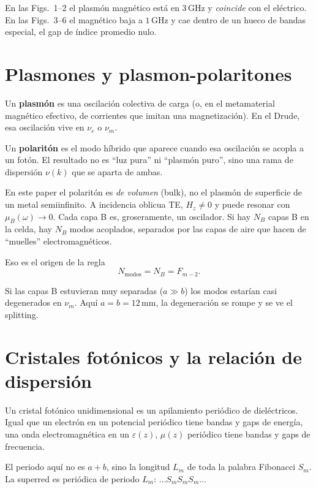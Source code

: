\documentclass[11pt,a4paper]{article}
\begin{document}
En las Figs.\ 1--2 el plasmón magnético está en \(3\,\mathrm{GHz}\) y
\emph{coincide} con el eléctrico.
En las Figs.\ 3--6 el magnético baja a \(1\,\mathrm{GHz}\) y cae dentro de un
hueco de bandas especial, el gap de índice promedio nulo.

\section{Plasmones y plasmon-polaritones}

Un \textbf{plasmón} es una oscilación colectiva de carga (o, en el metamaterial
magnético efectivo, de corrientes que imitan una magnetización).
En el Drude, esa oscilación vive en \(\nu_e\) o \(\nu_m\).

Un \textbf{polaritón} es el modo híbrido que aparece cuando esa oscilación se
acopla a un fotón. El resultado no es ``luz pura'' ni ``plasmón puro'', sino
una rama de dispersión \(\nu(k)\) que se aparta de ambas.

En este paper el polaritón es \emph{de volumen} (bulk), no el plasmón de
superficie de un metal semiinfinito.
A incidencia oblicua TE, \(H_z\neq 0\) y puede resonar con \(\mu_B(\omega)\to 0\).
Cada capa B es, groseramente, un oscilador.
Si hay \(N_B\) capas B en la celda, hay \(N_B\) modos acoplados, separados por
las capas de aire que hacen de ``muelles'' electromagnéticos.

Eso es el origen de la regla
\begin{equation}
N_{\mathrm{modos}}=N_B=F_{m-2}.
\end{equation}

Si las capas B estuvieran muy separadas (\(a\gg b\)) los modos estarían casi
degenerados en \(\nu_m\). Aquí \(a=b=12\,\mathrm{mm}\), la degeneración se rompe
y se ve el splitting.

\section{Cristales fotónicos y la relación de dispersión}

Un cristal fotónico unidimensional es un apilamiento periódico de dieléctricos.
Igual que un electrón en un potencial periódico tiene bandas y gaps de energía,
una onda electromagnética en un \(\varepsilon(z)\), \(\mu(z)\) periódico tiene
bandas y gaps de frecuencia.

El periodo aquí no es \(a+b\), sino la longitud \(L_m\) de toda la palabra
Fibonacci \(S_m\). La superred es periódica de periodo \(L_m\):
\(\ldots S_m S_m S_m\ldots\)
\end{document}
